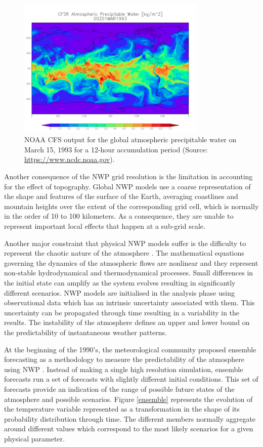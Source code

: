 \begin{figure}[h]
 \centerline{\includegraphics[width=9cm]{CFS.png}} \caption{NOAA CFS output for the global atmospheric precipitable water on March 15, 1993 for a 12-hour accumulation period (Source: \url{https://www.ncdc.noaa.gov}).}\label{CFS}
\end{figure}

Another consequence of the NWP grid resolution is the limitation in accounting for the effect of topography. Global NWP models use a coarse representation of the shape and features of the surface of the Earth, averaging coastlines and mountain heights over the extent of the corresponding grid cell, which is normally in the order of 10 to 100 kilometers. As a consequence, they are unable to represent important local effects that happen at a sub-grid scale.

\medskip

Another major constraint that physical NWP models suffer is the difficulty to represent the chaotic nature of the atmosphere \citep{lorenz1982atmospheric}. The mathematical equations governing the dynamics of the atmospheric flows are nonlinear and they represent non-stable hydrodynamical and thermodynamical processes. Small differences in the initial state can amplify as the system evolves resulting in significantly different scenarios. NWP models are initialised in the analysis phase using observational data which has an intrinsic uncertainty associated with them. This uncertainty can be propagated through time resulting in a variability in the results. The instability of the atmosphere defines an upper and lower bound on the predictability of instantaneous weather patterns.

\medskip

At the beginning of the 1990's, the meteorological community proposed ensemble forecasting as a methodology to measure the predictability of the atmosphere using NWP \citep{molteni1996ecmwf}. Instead of making a single high resolution simulation, ensemble forecasts run a set of forecasts with slightly different initial conditions. This set of forecasts provide an indication of the range of possible future states of the atmosphere and possible scenarios. Figure \ref{ensemble} represents the evolution of the temperature variable represented as a transformation in the shape of its probability distribution through time. The different members normally aggregate around different values which correspond to the most likely scenarios for a given physical parameter.

